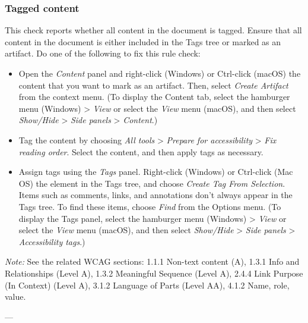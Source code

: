 \subsubsection{Tagged content}
This check reports whether all content in the document is tagged. Ensure that all content in the document is either included in the Tags tree or marked as an artifact\cite{AdobeHelpX}.
Do one of the following to fix this rule check:
\begin{itemize}
    \item Open the \emph{Content} panel and right-click (Windows) or Ctrl-click (macOS) the content that you want to mark as an artifact. Then, select \emph{Create Artifact} from the context menu. (To display the Content tab, select the hamburger menu (Windows) > \emph{View} or select the \emph{View} menu (macOS), and then select \emph{Show/Hide} > \emph{Side panels} > \emph{Content}.)
    \item Tag the content by choosing \emph{All tools} > \emph{Prepare for accessibility} > \emph{Fix reading order}. Select the content, and then apply tags as necessary.
    \item Assign tags using the \emph{Tags} panel. Right-click (Windows) or Ctrl-click (Mac OS) the element in the Tags tree, and choose \emph{Create Tag From Selection}. Items such as comments, links, and annotations don't always appear in the Tags tree. To find these items, choose \emph{Find} from the Options menu. (To display the Tags panel, select the hamburger menu (Windows) > \emph{View} or select the \emph{View} menu (macOS), and then select \emph{Show/Hide} > \emph{Side panels} > \emph{Accessibility tags}.)
\end{itemize}

\vspace{0.5em}
\noindent\textit{Note:} See the related WCAG sections: 1.1.1 Non-text content (A), 1.3.1 Info and Relationships (Level A), 1.3.2 Meaningful Sequence (Level A), 2.4.4 Link Purpose (In Context) (Level A), 3.1.2 Language of Parts (Level AA), 4.1.2 Name, role, value\cite{WCAG}.

---

